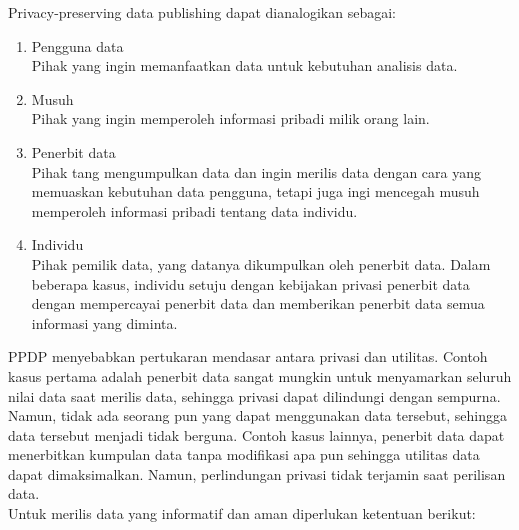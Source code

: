 \noindent Privacy-preserving data publishing dapat dianalogikan sebagai:
\begin{enumerate}

\item Pengguna data\\
Pihak yang ingin memanfaatkan data untuk kebutuhan analisis data.

\item Musuh\\
Pihak yang ingin  memperoleh informasi pribadi milik orang lain.

\item Penerbit data\\
Pihak tang mengumpulkan data dan ingin merilis data dengan cara yang memuaskan
kebutuhan data pengguna, tetapi juga ingi  mencegah musuh memperoleh informasi pribadi tentang data individu.

\item Individu \\
Pihak pemilik data, yang datanya dikumpulkan oleh penerbit data. Dalam beberapa kasus, individu setuju dengan kebijakan privasi penerbit data dengan mempercayai penerbit data dan memberikan penerbit data semua informasi yang diminta. 

\end{enumerate}

\noindent PPDP menyebabkan pertukaran mendasar antara privasi dan utilitas. Contoh kasus pertama adalah penerbit data sangat mungkin untuk menyamarkan seluruh nilai data saat merilis data, sehingga privasi dapat dilindungi dengan sempurna. Namun, tidak ada seorang pun yang dapat menggunakan data tersebut, sehingga data tersebut menjadi tidak berguna. Contoh kasus lainnya, penerbit data dapat menerbitkan kumpulan data tanpa modifikasi apa pun sehingga utilitas data dapat dimaksimalkan. Namun, perlindungan privasi tidak terjamin saat perilisan data. \\

\noindent Untuk merilis data yang informatif dan aman diperlukan ketentuan berikut:


